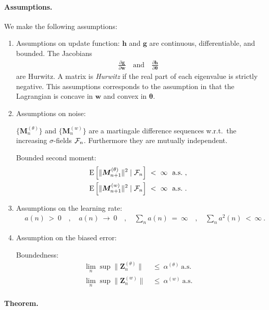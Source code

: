 \documentclass{article}
\newcommand\Bg{\bm{g}}
\newcommand\Bh{\bm{h}}
\newcommand\Bw{\bm{w}}
\newcommand\BM{\bm{M}}
\newcommand\BZ{\bm{Z}}
\newcommand\Bth{\bm{\theta}}
\newcommand{\rE}{\mathrm{E}} \newcommand{\rF}{\mathrm{F}}
\renewcommand{\leq}{\leqslant}
\begin{document}
\paragraph{Assumptions.}
We make the following assumptions:
\begin{enumerate}[label=\textbf{(A\arabic*)}]
\item Assumptions on update function:
$\Bh$ and $\Bg$ are continuous, differentiable, and bounded.
The Jacobians
\begin{align}
\frac{\partial \Bg}{\partial \Bw} \quad \text{and} \quad \frac{\partial \Bh}{\partial \Bth}
\end{align}
are Hurwitz.
A matrix is {\em Hurwitz} if the real part of each eigenvalue is strictly
negative.
This assumptions corresponds to the assumption in \cite{Zhang:07}
that the Lagrangian is concave in $\Bw$ and convex in $\Bth$.


\item Assumptions on noise:

$\{\BM^{(\theta)}_{n}\}$ and $\{\BM^{(w)}_{n}\}$
are a martingale difference sequences
w.r.t.\ the increasing $\sigma$-fields $\mathcal{F}_n$.
Furthermore they are mutually independent.

Bounded second moment:
\begin{align}
\rE \left[\|\BM^{(\theta)}_{n+1}\|^2 \mid \cF_n \right]
\ &< \ \infty \ \ \text{a.s.} \ , \\
\rE \left[\|\BM^{(w)}_{n+1}\|^2 \mid \cF_n \right]
\ &< \ \infty \ \ \text{a.s.} \ .
\end{align}

\item Assumptions on the learning rate:
\begin{align}
&a(n)\ > \ 0 \quad , \quad a(n)\ \to \ 0 \quad , \quad \sum_{n} a(n) \ = \ \infty \quad , \quad
\sum_{n} a^2(n) \ < \ \infty \ .
\end{align}

\item Assumption on the biased error:

Boundedness:
\begin{align}
\lim_n \sup  \| \BZ^{(\theta)}_n \| \  &\leq  \ \alpha^{(\theta)} \ \text{a.s.} \\
\lim_n \sup \| \BZ^{(w)}_n \| \  &\leq  \ \alpha^{(w)} \ \text{a.s.}
\end{align}

\end{enumerate}


\paragraph{Theorem.}
\end{document}
